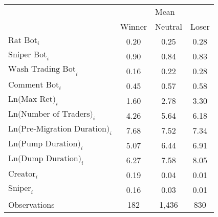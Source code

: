 \begin{tabular}{lccc}
\toprule
& \multicolumn{3}{c}{Mean} \\
\cmidrule{2-4}
& Winner & Neutral & Loser \\
\midrule
$\text{Rat Bot}_{i}$ & 0.20 & 0.25 & 0.28 \\
$\text{Sniper Bot}_{i}$ & 0.90 & 0.84 & 0.83 \\
$\text{Wash Trading Bot}_{i}$ & 0.16 & 0.22 & 0.28 \\
$\text{Comment Bot}_{i}$ & 0.45 & 0.57 & 0.58 \\
$\text{Ln(Max Ret)}_{i}$ & 1.60 & 2.78 & 3.30 \\
$\text{Ln(Number of Traders)}_{i}$ & 4.26 & 5.64 & 6.18 \\
$\text{Ln(Pre-Migration Duration)}_{i}$ & 7.68 & 7.52 & 7.34 \\
$\text{Ln(Pump Duration)}_{i}$ & 5.07 & 6.44 & 6.91 \\
$\text{Ln(Dump Duration)}_{i}$ & 6.27 & 7.58 & 8.05 \\
$\text{Creator}_{i}$ & 0.19 & 0.04 & 0.01 \\
$\text{Sniper}_{i}$ & 0.16 & 0.03 & 0.01 \\
\midrule
Observations & 182 & 1,436 & 830 \\
\bottomrule
\end{tabular}